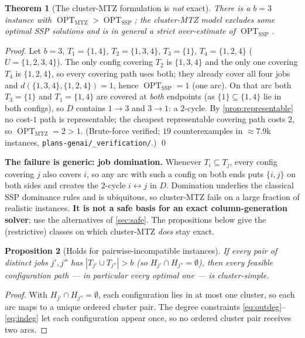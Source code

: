 \documentclass[11pt,a4paper]{article}
\theoremstyle{plain}
\newtheorem{theorem}{Theorem}[section]
\newtheorem{proposition}[theorem]{Proposition}
\theoremstyle{definition}
\DeclareMathOperator{\OPT}{OPT}
\newcommand{\OMTZ}{\OPT_{\mathrm{MTZ}}}
\newcommand{\OSSP}{\OPT_{\mathrm{SSP}}}
\begin{document}
\begin{thmbox}
	\begin{theorem}[The cluster-MTZ formulation is \emph{not} exact]
	\label{thm:notexact}
	There is a $b=3$ instance with $\OMTZ>\OSSP$; the cluster-MTZ model excludes some optimal
	SSP solutions and is in general a strict over-estimate of $\OSSP$.
	\end{theorem}
\end{thmbox}
\begin{proofbox}
	\begin{proof}
	Let $b=3$, $T_1=\{1,4\}$, $T_2=\{1,3,4\}$, $T_3=\{1\}$, $T_4=\{1,2,4\}$
	($U=\{1,2,3,4\}$). The only config covering $T_2$ is $\{1,3,4\}$ and the only one covering
	$T_4$ is $\{1,2,4\}$, so every covering path uses both; they already cover all four jobs and
	$d(\{1,3,4\},\{1,2,4\})=1$, hence $\OSSP=1$ (one arc). On that arc both $T_3=\{1\}$ and
	$T_1=\{1,4\}$ are covered at \emph{both} endpoints (as $\{1\}\subseteq\{1,4\}$ lie in both
	configs), so $D$ contains $1\!\to\!3$ and $3\!\to\!1$: a $2$-cycle. By
	\cref{prop:representable} no cost-$1$ path is representable; the cheapest representable
	covering path costs $2$, so $\OMTZ=2>1$. (Brute-force verified; $19$ counterexamples in
	$\approx7.9$k instances, \texttt{plans-genai/\_verification/}.) \qed
	\end{proof}
\end{proofbox}

\begin{warnbox}
	\textbf{The failure is generic: job domination.} Whenever $T_i\subseteq T_j$, every config
	covering $j$ also covers $i$, so any arc with such a config on both ends puts $\{i,j\}$ on
	both sides and creates the $2$-cycle $i\!\leftrightarrow\!j$ in $D$. Domination underlies the
	classical SSP dominance rules and is ubiquitous, so cluster-MTZ fails on a large fraction of
	realistic instances. \textbf{It is not a safe basis for an exact column-generation solver};
	use the alternatives of \cref{sec:safe}. The propositions below give the (restrictive)
	classes on which cluster-MTZ \emph{does} stay exact.
\end{warnbox}

\begin{thmbox}
	\begin{proposition}[Holds for pairwise-incompatible instances]
		\label{prop:exchange_disjoint}
		If every pair of distinct jobs $j',j''$ has $|T_{j'}\cup T_{j''}|>b$ (so
		$H_{j'}\cap H_{j''}=\emptyset$), then every feasible configuration path --- in
		particular every optimal one --- is cluster-simple.
	\end{proposition}
\end{thmbox}
\begin{proofbox}
	\begin{proof}
		With $H_{j'}\cap H_{j''}=\emptyset$, each configuration lies in at most one cluster, so
		each arc maps to a unique ordered cluster pair. The degree constraints
		\eqref{eq:outdeg}--\eqref{eq:indeg} let each configuration appear once, so no ordered
		cluster pair receives two arcs.
	\end{proof}
\end{proofbox}
\end{document}
